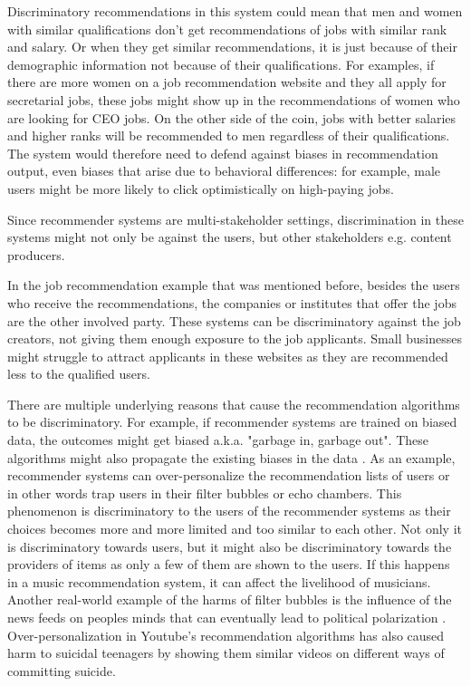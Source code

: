 Discriminatory recommendations in this system could mean that men and women with similar qualifications don't get recommendations of jobs with similar rank and salary. Or when they get similar recommendations, it is just because of their demographic information not because of their qualifications. For examples, if there are more women on a job recommendation website and they all apply for secretarial jobs, these jobs might show up in the recommendations of women who are looking for CEO jobs. On the other side of the coin, jobs with better salaries and higher ranks will be recommended to men regardless of their qualifications. The system would therefore need to defend against biases in recommendation output, even biases that arise due to behavioral differences: for example, male users might be more likely to click optimistically on high-paying jobs. 



Since recommender systems are multi-stakeholder settings, discrimination in these systems might not only be against the users, but other stakeholders e.g. content producers. 

In the job recommendation example that was mentioned before, besides the users who receive the recommendations, the companies or institutes that offer the jobs are the other involved party. These systems can be discriminatory against the job creators, not giving them enough exposure to the job applicants. Small businesses might struggle to attract applicants in these websites as they are recommended less to the qualified users.


There are multiple underlying reasons that cause the recommendation algorithms to be discriminatory. For example, if recommender systems are trained on biased data, the outcomes might get biased a.k.a. "garbage in, garbage out". These algorithms might also propagate the existing biases in the data \cite{barocas2016big}. As an example, recommender systems can over-personalize the recommendation lists of users or in other words trap users in their filter bubbles or echo chambers. This phenomenon is discriminatory to the users of the recommender systems as their choices becomes more and more limited and too similar to each other. Not only it is discriminatory towards users, but it might also be discriminatory towards the providers of items as only a few of them are shown to the users. If this happens in a music recommendation system, it can affect the livelihood of musicians. Another real-world example of the harms of filter bubbles is the influence of the news feeds on peoples minds that can eventually lead to political polarization . Over-personalization in Youtube's recommendation algorithms has also caused harm to suicidal teenagers by showing them similar videos on different ways of committing suicide. 

